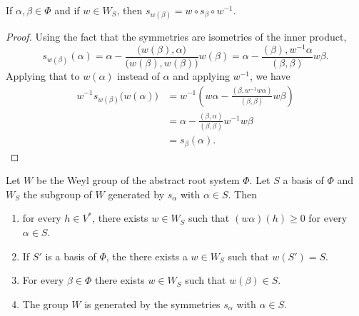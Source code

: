 \begin{lemma}\label{Lemswwsbwemucirc}
    If \( \alpha,\beta\in\Phi\) and if \( w\in W_S\), then \( s_{w(\beta)}=w\circ s_{\beta}\circ w^{-1}\).
\end{lemma}

\begin{proof}
    Using the fact that the symmetries are isometries of the inner product,
    \begin{equation}
        s_{w(\beta)}(\alpha)=\alpha-\frac{ \big( w(\beta),\alpha \big) }{ \big( w(\beta),w(\beta) \big) }w(\beta)=\alpha-\frac{ (\beta),w^{-1}\alpha }{ (\beta,\beta) }w\beta.
    \end{equation}
    Applying that to \( w(\alpha)\) instead of \( \alpha\) and applying \( w^{-1}\), we have
    \begin{subequations}
        \begin{align}
            w^{-1}s_{w(\beta)}\big(w(\alpha)\big)&=w^{-1}\left( w\alpha-\frac{ (\beta,w^{-1}w\alpha) }{ (\beta,\beta) }w\beta \right)\\
            &=\alpha-\frac{ (\beta,\alpha) }{ (\beta,\beta) }w^{-1}w\beta\\
            &=s_{\beta}(\alpha).
        \end{align}
    \end{subequations}
\end{proof}

\begin{theorem}     \label{ThoWeylGenere}
    Let \( W\) be the Weyl group of the abstract root system \( \Phi\). Let \( S\) a basis of \( \Phi\) and \( W_S\) the subgroup of \( W\) generated by \( s_{\alpha}\) with \(\alpha\in S\). Then
    \begin{enumerate}
        \item   \label{ItemThoWeylGenerei}
            for every \( h\in V^*\), there exists \( w\in W_S\) such that \( (w\alpha)(h)\geq 0\) for every \( \alpha\in S\).
        \item   \label{ItemThoWeylGenereii}
            If \( S'\) is a basis of \( \Phi\), the there exists a \( w\in W_S\) such that \( w(S')=S\).
        \item\label{ItemThoWeylGenereiii}
            For every \( \beta\in\Phi\) there exists \( w\in W_S\) such that \( w(\beta)\in S\).
        \item\label{ItemThoWeylGenereiv}
            The group \( W\) is generated by the symmetries \( s_{\alpha}\) with \( \alpha\in S\).
    \end{enumerate}
\end{theorem}

